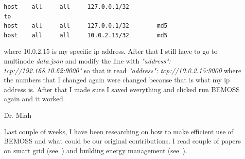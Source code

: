 \documentclass[fontsize=11pt, %
                             paper=letter, %
                             twoside, %
                             captions=tableheading,
                             index=totoc,
                             hyperref]{labbook}
\begin{document}
%  
\begin{verbatim}
host    all     all     127.0.0.1/32
to 
host    all     all     127.0.0.1/32        md5
host    all     all     10.0.2.15/32        md5     
\end{verbatim}
%
where 10.0.2.15 is my specific ip address. After that I still have to go to multinode \emph{data.json} and modify the line with \emph{"address": tcp://192.168.10.62:9000"} so that it read \emph{"address": tcp://10.0.2.15:9000} where the numbers that I changed again were changed because that is what my ip address is. After that I made sure I saved everything and clicked run BEMOSS again and it worked.


Dr. Miah

Last couple of weeks, I have been researching on how to make efficient use of BEMOSS and what could be our original contributions. I read couple of papers on smart grid (see~\cite{Mocanu2018,Mocanu2018,FrancoisLavet2014,FrancoisLavet2017}) and building energy management (see~\cite{Ferreira2012,Pipattanasomporn2015,Khamphanchai2015,Zhang2016}).  
\end{document}
